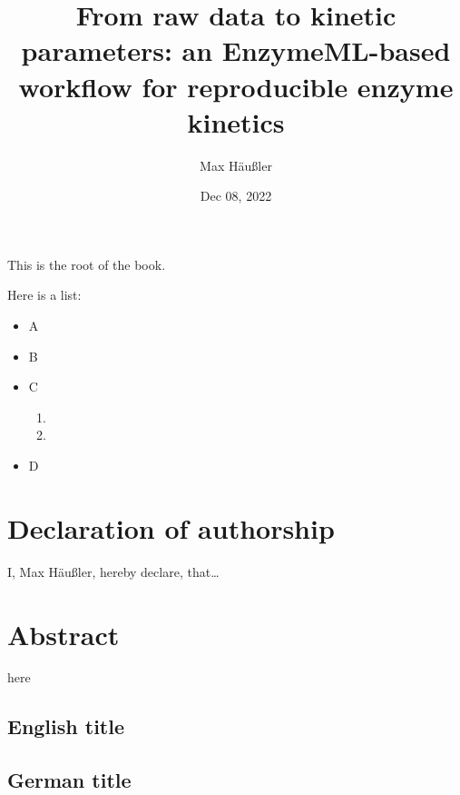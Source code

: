 \documentclass[letterpaper,10pt,english]{jupyterBook}
\title{From raw data to kinetic parameters: an EnzymeML-based workflow for reproducible enzyme kinetics}
\date{Dec 08, 2022}
\author{Max Häußler}
\begin{document}
\pagestyle{empty}
\sphinxmaketitle
\pagestyle{plain}
\sphinxtableofcontents
\pagestyle{normal}
\label{\detokenize{welcome::doc}}


\sphinxAtStartPar
This is the root of the book.

\sphinxAtStartPar
Here is a list:
\begin{itemize}
\item {} 
\sphinxAtStartPar
A

\item {} 
\sphinxAtStartPar
B

\item {} 
\sphinxAtStartPar
C
\begin{enumerate}
%
\item {} 

\item {} 

\end{enumerate}

\item {} 
\sphinxAtStartPar
D

\end{itemize}

\sphinxstepscope


\chapter{Declaration of authorship}
\label{\detokenize{declaration:declaration-of-authorship}}\label{\detokenize{declaration::doc}}
\sphinxAtStartPar
I, Max Häußler, hereby declare, that…

\sphinxstepscope


\chapter{Abstract}
\label{\detokenize{abstract:abstract}}\label{\detokenize{abstract::doc}}
\sphinxAtStartPar
here


\section{English title}
\label{\detokenize{abstract:english-title}}

\section{German title}
\label{\detokenize{abstract:german-title}}
\sphinxstepscope
\end{document}
